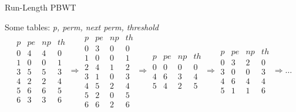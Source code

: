 \documentclass{beamer}
\begin{document}
\begin{frame}{Run-Length PBWT}
  \begin{block}{Some tables: \textit{p, perm, next perm, threshold}}
      {\footnotesize{\[
      \begin{matrix}
        p & pe & np & th\\
        \hline
        0 & 4 & 4 & 0\\
        1 & 0 & 0 & 1\\
        3 & 5 & 5 & 3\\
        4 & 2 & 2 & 4\\
        5 & 6 & 6 & 5\\
        6 & 3 & 3 & 6
      \end{matrix}\Longrightarrow \begin{matrix}
        p & pe & np & th\\
        \hline
        0 & 3 & 0 & 0\\
        1 & 0 & 0 & 1\\
        2 & 4 & 1 & 2\\
        3 & 1 & 0 & 3\\
        4 & 5 & 2 & 4\\
        5 & 2 & 0 & 5\\
        6 & 6 & 2 & 6
      \end{matrix}\Longrightarrow \begin{matrix}
        p & pe & np & th\\
        \hline
        0 & 0 & 0 & 0\\
        4 & 6 & 3 & 4\\
        5 & 4 & 2 & 5
      \end{matrix}\Longrightarrow \begin{matrix}
        p & pe & np & th\\
        \hline
        0 & 3 & 2 & 0\\
        3 & 0 & 0 & 3\\
        4 & 6 & 4 & 4\\
        5 & 1 & 1 & 6
      \end{matrix}\Rightarrow\ldots\]}}
\end{block}
\end{frame}

%     
%     
\end{document}

